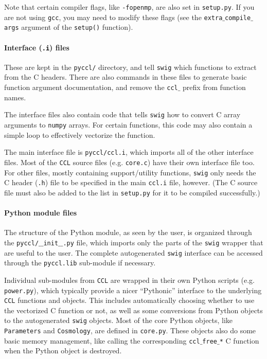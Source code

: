 \documentclass[\docopts]{\docclass}
\begin{document}
Note that certain compiler flags, like {\tt -fopenmp}, are also set in {\tt setup.py}. If you are not using {\tt gcc}, you may need to modify these flags (see the {\tt extra$\_$compile$\_$args} argument of the {\tt setup()} function).

\paragraph{Interface ({\tt .i}) files} These are kept in the {\tt pyccl/} directory, and tell {\tt swig} which functions to extract from the C headers. There are also commands in these files to generate basic function argument documentation, and remove the {\tt ccl$\_$} prefix from function names.

The interface files also contain code that tells {\tt swig} how to convert C array arguments to {\tt numpy} arrays. For certain functions, this code may also contain a simple loop to effectively vectorize the function.

The main interface file is {\tt pyccl/ccl.i}, which imports all of the other interface files. Most of the {\tt CCL} source files (e.g. {\tt core.c}) have their own interface file too. For other files, mostly containing support/utility functions, {\tt swig} only needs the C header ({\tt .h}) file to be specified in the main {\tt ccl.i} file, however. (The C source file must also be added to the list in {\tt setup.py} for it to be compiled successfully.)

\paragraph{Python module files} The structure of the Python module, as seen by the user, is organized through the {\tt pyccl/$\_$$\_$init$\_$$\_$.py} file, which imports only the parts of the {\tt swig} wrapper that are useful to the user. The complete autogenerated {\tt swig} interface can be accessed through the {\tt pyccl.lib} sub-module if necessary.

Individual sub-modules from {\tt CCL} are wrapped in their own Python scripts (e.g. {\tt power.py}), which typically provide a nicer ``Pythonic'' interface to the underlying {\tt CCL} functions and objects. This includes automatically choosing whether to use the vectorized C function or not, as well as some conversions from Python objects to the autogenerated {\tt swig} objects. Most of the core Python objects, like {\tt Parameters} and {\tt Cosmology}, are defined in {\tt core.py}. These objects also do some basic memory management, like calling the corresponding {\tt ccl$\_$free$\_$*} C function when the Python object is destroyed.
\end{document}
